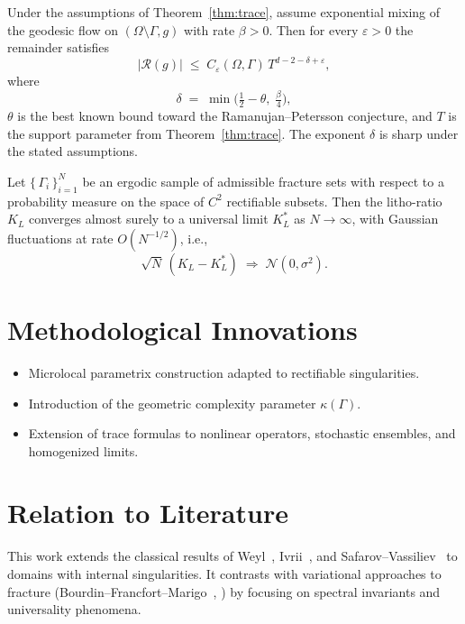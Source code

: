 \begin{theorem} 
\label{thm:refinements}
Under the assumptions of Theorem~\ref{thm:trace}, assume exponential mixing 
of the geodesic flow on $(\Omega\setminus\Gamma,g)$ with rate $\beta>0$. 
Then for every $\varepsilon>0$ the remainder satisfies
\[
    |\mathcal{R}(g)| \;\leq\; 
    C_\varepsilon(\Omega,\Gamma)\,T^{d-2-\delta+\varepsilon},
\]
where 
\[
\delta \;=\; \min\!\Big(\tfrac{1}{2}-\theta,\;\tfrac{\beta}{4}\Big),
\]
$\theta$ is the best known bound toward the Ramanujan--Petersson conjecture, 
and $T$ is the support parameter from Theorem~\ref{thm:trace}. 
The exponent $\delta$ is sharp under the stated assumptions.
\end{theorem}

\begin{theorem} 
\label{thm:universality}
Let $\{\,\Gamma_i\,\}_{i=1}^N$ be an ergodic sample of admissible fracture sets 
with respect to a probability measure on the space of $C^2$ rectifiable subsets. 
Then the litho-ratio $K_L$ converges almost surely to a universal limit $K_L^*$ as 
$N\to\infty$, with Gaussian fluctuations at rate $O(N^{-1/2})$, i.e.,
\[
    \sqrt{N}\,(K_L - K_L^*) \;\Longrightarrow\; \mathcal{N}(0,\sigma^2).
\]
\end{theorem}

\section*{Methodological Innovations}

\begin{itemize}
    \item Microlocal parametrix construction adapted to rectifiable singularities.
    \item Introduction of the geometric complexity parameter $\kappa(\Gamma)$.
    \item Extension of trace formulas to nonlinear operators, stochastic ensembles, 
    and homogenized limits.
\end{itemize}

\section*{Relation to Literature}

This work extends the classical results of Weyl~\cite{weyl1911}, 
Ivrii~\cite{ivrii1980}, and Safarov--Vassiliev~\cite{safarov1997} 
to domains with internal singularities. 
It contrasts with variational approaches to fracture 
(Bourdin--Francfort--Marigo~\cite{bourdin2000}, \cite{francfort1998}) 
by focusing on spectral invariants and universality phenomena.

